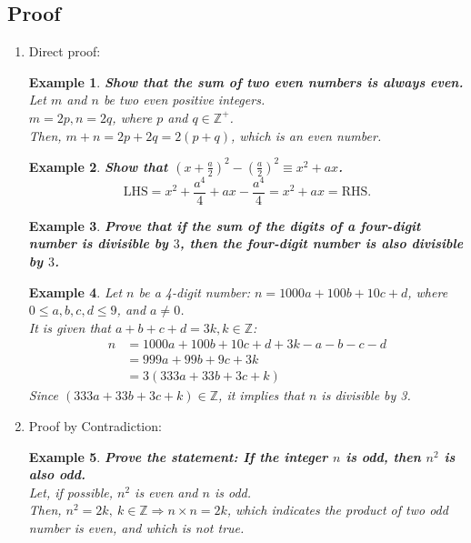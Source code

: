 \documentclass[12pt, a4paper]{article}
\newtheorem{example}{Example}[subsection]
\begin{document}
\subsection{Proof}
\begin{enumerate}
  \item Direct proof:
  \begin{example}
    \textbf{Show that the sum of two even numbers is always even.}\\
    Let $m$ and $n$ be two even positive integers. \\
    $m=2p, n=2q$, where $p$ and $q \in \mathbb{Z}^+$. \\
    Then, $m+n=2p+2q=2(p+q)$, which is an even number. 
  \end{example}
  \begin{example}
    \textbf{Show that $\left(x+\frac{a}{2}\right)^2-\left(\frac{a}{2}\right)^2 \equiv x^2+ax$.} 
    $$\text{LHS}=x^2+\frac{a^4}{4}+ax-\frac{a^4}{4}=x^2+ax=\text{RHS}.$$
  \end{example}
  {\color{green}{Equations "$=$": only true from some values.\\Identities "$\equiv$": true for all values.}}
  \begin{example}
    \textbf{Prove that if the sum of the digits of a four-digit number is divisible by $3$, then the four-digit number is also divisible by $3$.}
  \end{example}
  \begin{example}
    Let $n$ be a 4-digit number: $n=1000a+100b+10c+d$, where $0\leq a,b,c,d\leq 9$, and $a\neq 0$.\\
    It is given that $a+b+c+d=3k, k \in \mathbb{Z}$:
    $$\begin{aligned}
        n&=1000a+100b+10c+d+3k-a-b-c-d\\
        &=999a+99b+9c+3k\\
        &=3(333a+33b+3c+k)
      \end{aligned}$$
    Since $(333a+33b+3c+k)\in \mathbb{Z}$, it implies that $n$ is divisible by 3. 
  \end{example}
  \item Proof by Contradiction: 
  \begin{example}
    \textbf{Prove the statement: If the integer $n$ is odd, then $n^2$ is also odd.}\\
    Let, if possible, $n^2$ is even and $n$ is odd. \\
    Then, $n^2=2k,\ k\in \mathbb{Z} \Rightarrow n\times n=2k$, which indicates the product of two odd number is even, and which is not true. \\

\end{example}
\end{enumerate}
\end{document}
